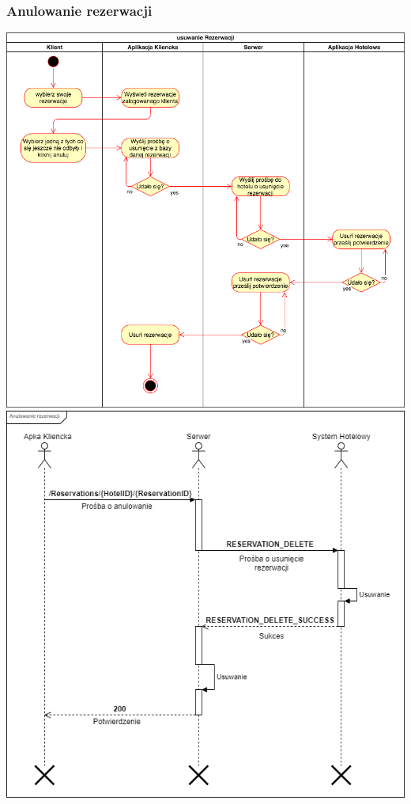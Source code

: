 \documentclass{article}
\begin{document}
\subsubsection{Anulowanie rezerwacji}
\begin{center}
    \includegraphics[scale=0.4]{Aktywnosc/IO_Aktywności-Usuwanie rezerwacji.png}\newpage
    \includegraphics[width=\linewidth]{Sekwencje/Reservation_Cancel.png}
\end{center}
\end{document}
